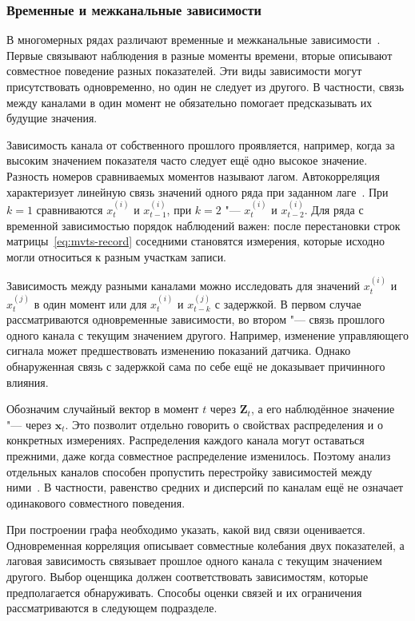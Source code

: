 \documentclass[bachelor, och, diploma]{SCWorks}
\begin{document}
\subsubsection{Временные и межканальные зависимости}

В многомерных рядах различают временные и межканальные зависимости~\cite{jin2024gnn4ts}. Первые связывают наблюдения в разные моменты времени, вторые описывают совместное поведение разных показателей. Эти виды зависимости могут присутствовать одновременно, но один не следует из другого. В частности, связь между каналами в один момент не обязательно помогает предсказывать их будущие значения.

Зависимость канала от собственного прошлого проявляется, например, когда за высоким значением показателя часто следует ещё одно высокое значение. Разность номеров сравниваемых моментов называют лагом. Автокорреляция характеризует линейную связь значений одного ряда при заданном лаге~\cite{hyndman2021fpp3}. При $k=1$ сравниваются $x_t^{(i)}$ и $x_{t-1}^{(i)}$, при $k=2$ "--- $x_t^{(i)}$ и $x_{t-2}^{(i)}$. Для ряда с временной зависимостью порядок наблюдений важен: после перестановки строк матрицы~\eqref{eq:mvts-record} соседними становятся измерения, которые исходно могли относиться к разным участкам записи.

Зависимость между разными каналами можно исследовать для значений $x_t^{(i)}$ и $x_t^{(j)}$ в один момент или для $x_t^{(i)}$ и $x_{t-k}^{(j)}$ с задержкой. В первом случае рассматриваются одновременные зависимости, во втором "--- связь прошлого одного канала с текущим значением другого. Например, изменение управляющего сигнала может предшествовать изменению показаний датчика. Однако обнаруженная связь с задержкой сама по себе ещё не доказывает причинного влияния.

Обозначим случайный вектор в момент $t$ через $\mathbf{Z}_t$, а его наблюдённое значение "--- через $\mathbf{x}_t$. Это позволит отдельно говорить о свойствах распределения и о конкретных измерениях. Распределения каждого канала могут оставаться прежними, даже когда совместное распределение изменилось. Поэтому анализ отдельных каналов способен пропустить перестройку зависимостей между ними~\cite{wu2024changepoint}. В частности, равенство средних и дисперсий по каналам ещё не означает одинакового совместного поведения.

При построении графа необходимо указать, какой вид связи оценивается. Одновременная корреляция описывает совместные колебания двух показателей, а лаговая зависимость связывает прошлое одного канала с текущим значением другого. Выбор оценщика должен соответствовать зависимостям, которые предполагается обнаруживать. Способы оценки связей и их ограничения рассматриваются в следующем подразделе.
\end{document}
